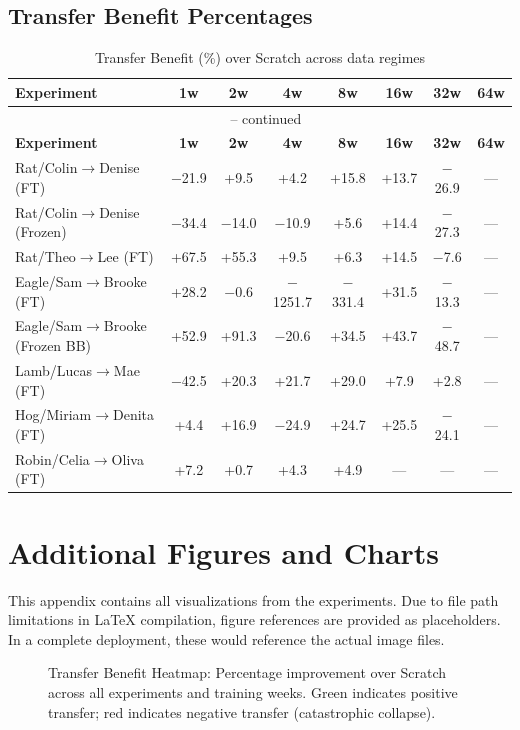 \documentclass[12pt,a4paper]{report}
\begin{document}
\section{Transfer Benefit Percentages}

\begin{longtable}{lccccccc}
\caption{Transfer Benefit (\%) over Scratch across data regimes} \\
\toprule
\textbf{Experiment} & \textbf{1w} & \textbf{2w} & \textbf{4w} & \textbf{8w} & \textbf{16w} & \textbf{32w} & \textbf{64w} \\
\midrule
\endfirsthead
\multicolumn{8}{c}{{\tablename\ \thetable{} -- continued}} \\
\toprule
\textbf{Experiment} & \textbf{1w} & \textbf{2w} & \textbf{4w} & \textbf{8w} & \textbf{16w} & \textbf{32w} & \textbf{64w} \\
\midrule
\endhead
\bottomrule
\endlastfoot
Rat/Colin$\to$Denise (FT) & $-$21.9 & +9.5 & +4.2 & +15.8 & +13.7 & $-$26.9 & --- \\
Rat/Colin$\to$Denise (Frozen) & $-$34.4 & $-$14.0 & $-$10.9 & +5.6 & +14.4 & $-$27.3 & --- \\
Rat/Theo$\to$Lee (FT) & +67.5 & +55.3 & +9.5 & +6.3 & +14.5 & $-$7.6 & --- \\
Eagle/Sam$\to$Brooke (FT) & +28.2 & $-$0.6 & $-$1251.7 & $-$331.4 & +31.5 & $-$13.3 & --- \\
Eagle/Sam$\to$Brooke (Frozen BB) & +52.9 & +91.3 & $-$20.6 & +34.5 & +43.7 & $-$48.7 & --- \\
Lamb/Lucas$\to$Mae (FT) & $-$42.5 & +20.3 & +21.7 & +29.0 & +7.9 & +2.8 & --- \\
Hog/Miriam$\to$Denita (FT) & +4.4 & +16.9 & $-$24.9 & +24.7 & +25.5 & $-$24.1 & --- \\
Robin/Celia$\to$Oliva (FT) & +7.2 & +0.7 & +4.3 & +4.9 & --- & --- & --- \\
\end{longtable}

\chapter{Additional Figures and Charts}

This appendix contains all visualizations from the experiments. Due to file path limitations in LaTeX compilation, figure references are provided as placeholders. In a complete deployment, these would reference the actual image files.

\begin{figure}[H]
\centering
\caption{Transfer Benefit Heatmap: Percentage improvement over Scratch across all experiments and training weeks. Green indicates positive transfer; red indicates negative transfer (catastrophic collapse).}
\label{fig:benefit_heatmap}
\end{figure}
\end{document}

